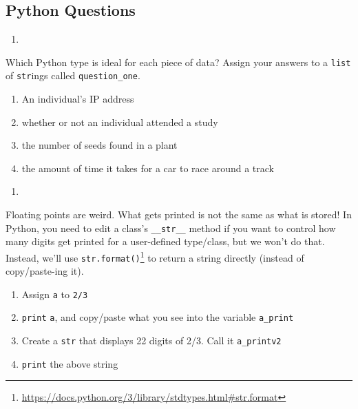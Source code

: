 \documentclass[12pt,krantz2]{krantz}
\providecommand{\tightlist}{%
  \setlength{\itemsep}{0pt}\setlength{\parskip}{0pt}}
\renewcommand{\href}[2]{#2\footnote{\url{#1}}}
\begin{document}
\hypertarget{python-questions}{%
\subsection{Python Questions}\label{python-questions}}

\begin{enumerate}
\def\labelenumi{\arabic{enumi}.}
\item
\end{enumerate}

Which Python type is ideal for each piece of data? Assign your answers to a \texttt{list} of \texttt{str}ings called \texttt{question\_one}.

\begin{enumerate}
\def\labelenumi{\alph{enumi})}
\tightlist
\item
  An individual's IP address
\item
  whether or not an individual attended a study
\item
  the number of seeds found in a plant
\item
  the amount of time it takes for a car to race around a track
\end{enumerate}

\begin{enumerate}
\def\labelenumi{\arabic{enumi}.}
\setcounter{enumi}{1}
\item
\end{enumerate}

Floating points are weird. What gets printed is not the same as what is stored! In Python, you need to edit a class's \texttt{\_\_str\_\_} method if you want to control how many digits get printed for a user-defined type/class, but we won't do that. Instead, we'll use \href{https://docs.python.org/3/library/stdtypes.html\#str.format}{\texttt{str.format()}} to return a string directly (instead of copy/paste-ing it).

\begin{enumerate}
\def\labelenumi{\alph{enumi})}
\tightlist
\item
  Assign \texttt{a} to \texttt{2/3}
\item
  \texttt{print} \texttt{a}, and copy/paste what you see into the variable \texttt{a\_print}
\item
  Create a \texttt{str} that displays 22 digits of 2/3. Call it \texttt{a\_printv2}
\item
  \texttt{print} the above string
\end{enumerate}
\end{document}
